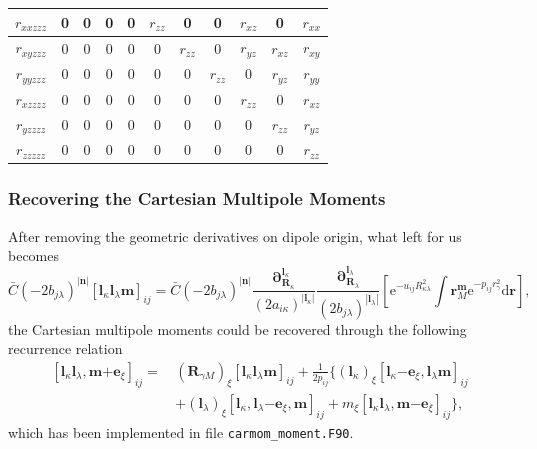 \documentclass[a4paper,11pt,twoside,openright]{book}
\begin{document}
\begin{table}[hbtp]
\begin{tabular}{c||c|c|c|c||c|c|c||c|c||c}
    $r_{xxzzz}$ & 0 & 0 & 0 & 0 & $r_{zz}$ & 0 & 0 & $r_{xz}$ & 0 & $r_{xx}$\\
    \hline
    $r_{xyzzz}$ & 0 & 0 & 0 & 0 & 0 & $r_{zz}$ & 0 & $r_{yz}$ & $r_{xz}$ & $r_{xy}$\\
    \hline
    $r_{yyzzz}$ & 0 & 0 & 0 & 0 & 0 & 0 & $r_{zz}$ & 0 & $r_{yz}$ & $r_{yy}$\\
    \hline\hline
    $r_{xzzzz}$ & 0 & 0 & 0 & 0 & 0 & 0 & 0 & $r_{zz}$ & 0 & $r_{xz}$\\
    \hline
    $r_{yzzzz}$ & 0 & 0 & 0 & 0 & 0 & 0 & 0 & 0 & $r_{zz}$ & $r_{yz}$\\
    \hline\hline
    $r_{zzzzz}$ & 0 & 0 & 0 & 0 & 0 & 0 & 0 & 0 & 0 & $r_{zz}$\\
    \hline\hline
  \end{tabular}
\end{table}

\subsubsection{Recovering the Cartesian Multipole Moments}

After removing the geometric derivatives on dipole origin, what left for us becomes
\begin{equation}
  \bar{C}(-2b_{j\lambda})^{|\boldsymbol{n}|}%
    \left[\boldsymbol{l}_{\kappa}\boldsymbol{l}_{\lambda}\boldsymbol{m}\right]_{ij}
  =\bar{C}(-2b_{j\lambda})^{|\boldsymbol{n}|}%
    \frac{\boldsymbol{\partial}_{\boldsymbol{R}_{\kappa}}^{\boldsymbol{l}_{\kappa}}}%
      {(2a_{i\kappa})^{|\boldsymbol{l}_{\kappa}|}}%
    \frac{\boldsymbol{\partial}_{\boldsymbol{R}_{\lambda}}^{\boldsymbol{l}_{\lambda}}}%
      {(2b_{j\lambda})^{|\boldsymbol{l}_{\lambda}|}}%
    \left[\mathrm{e}^{-u_{ij}R_{\kappa\lambda}^2}\int\boldsymbol{r}_{M}^{\boldsymbol{m}}%
        \mathrm{e}^{-p_{ij}r_{\gamma}^2}\mathrm{d}\boldsymbol{r}\right],
\end{equation}
the Cartesian multipole moments could be recovered through the following recurrence relation~\cite{Reine:PCCP9:4771}
\begin{align}
  \label{eq:multipole-moment-order}
  \left[\boldsymbol{l}_{\kappa}\boldsymbol{l}_{\lambda},\boldsymbol{m}\mathrm{+}\boldsymbol{e}_{\xi}\right]_{ij}
  =\,&(\boldsymbol{R}_{\gamma M})_{\xi}%
    \left[\boldsymbol{l}_{\kappa}\boldsymbol{l}_{\lambda}\boldsymbol{m}\right]_{ij}
  +\frac{1}{2p_{ij}}\biggl\{(\boldsymbol{l}_{\kappa})_{\xi}%
    \left[\boldsymbol{l}_{\kappa}\mathrm{-}\boldsymbol{e}_{\xi},\boldsymbol{l}_{\lambda}\boldsymbol{m}\right]_{ij}\\
  &+(\boldsymbol{l}_{\lambda})_{\xi}%
    \left[\boldsymbol{l}_{\kappa},\boldsymbol{l}_{\lambda}\mathrm{-}\boldsymbol{e}_{\xi},\boldsymbol{m}\right]_{ij}
  +m_{\xi}\left[\boldsymbol{l}_{\kappa}\boldsymbol{l}_{\lambda},%
    \boldsymbol{m}\mathrm{-}\boldsymbol{e}_{\xi}\right]_{ij}\biggr\},\nonumber
\end{align}
which has been implemented in file \verb|carmom_moment.F90|.
\end{document}

